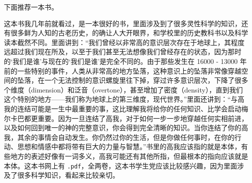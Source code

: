 下面推荐一本书。

\begin{book}[《生命之花的古老秘密》]
    这本书我几年前就看过，是一本很好的书，里面涉及到了很多灵性科学的知识，还有很多鲜为人知的古老历史，的确让人大开眼界，和学校里的历史教科书以及科学读本截然不同。里面讲到：“我们曾经以非常高的意识层次存在于地球上，其程度远超过我们现在所及，以至于我们甚至无法想像我们曾经存在的状态，因为那时的‘我们是谁’与现在的‘我们是谁’是完全不同的。由于那些发生在 16000 - 13000 年前的一些特别的事件，人类从非常高的地方坠落，这种意识上的坠落非常像穿越空间的坠落，在一个无法控制的意识螺旋里往下掉，穿过许多意识层次，下降了很多个维度（dimension）和泛音（overtone），甚至增加了密度（density），直到我们这个特别的地方——我们称为地球上的第三维度，现代世界。”里面还讲到：“与高我的连结可能是一生中最重要的事，这比理解我将给你的任何知识、比学会启动梅尔卡巴都更重要。因为一旦连结了高我，对于如何一步一步地穿越任何实相前进，以及如何回到唯一的神的完整意识，你会得到完全清晰的知识。当你连结了你的高我，其余的事情会自动发生。你仍然过你的生活，但是你做任何事时，在你的行动、思想和情感中都将带有巨大的力量与智慧。”书里的高我应该指的就是本体，有些地方的表述好像有一词多义，高我可能还有其他所指，但最根本的指向应该就是本体。这本书网上有 \texttt{.pdf}，全两卷，这本书学生党应该比较感兴趣，因为里面涉及了很多科学知识，看起来比较亲切。
\end{book}
